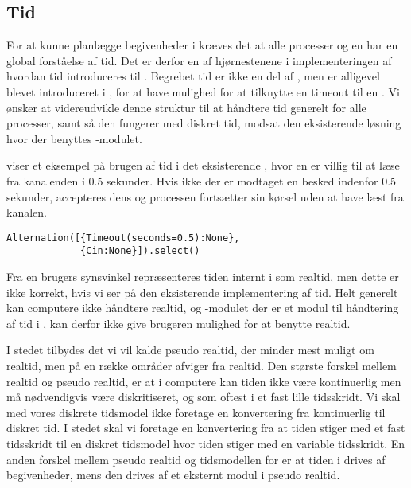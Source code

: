 \subsection{Tid} \label{sec:tid}
For at kunne planlægge begivenheder i \des kræves det at alle processer og \sched en har en global forståelse af tid.  Det er derfor en af hjørnestenene i implementeringen af \des hvordan tid introduceres til \pycsp.  
Begrebet tid er ikke en del af \csp, men er alligevel blevet introduceret i \pycsp, for  at  have
mulighed for at tilknytte en timeout til en . Vi ønsker
at videreudvikle denne struktur til at håndtere tid generelt for alle
processer, samt så den fungerer med diskret tid, modsat den eksisterende
løsning hvor der benyttes -modulet.
 
 viser et eksempel på brugen af tid i det eksisterende \pycsp, hvor en  er villig
til at læse fra kanalenden  i $0.5$ sekunder. Hvis ikke der
er modtaget en besked indenfor 0.5 sekunder, accepteres dens 
og processen fortsætter sin kørsel uden at have læst fra kanalen.

\begin{lstlisting}[float=hbtp, 
label=Timeout,caption=Timeout i Alternation (fra dokumentationen til PyCSP)]
Alternation([{Timeout(seconds=0.5):None}, 
             {Cin:None}]).select()
\end{lstlisting}


Fra en brugers synsvinkel repræsenteres tiden internt i \pycsp som realtid, men dette er ikke korrekt, hvis vi ser på den eksisterende implementering af tid. Helt generelt kan computere ikke håndtere  realtid, og -modulet der er et modul til håndtering af tid i \pycsp, kan derfor ikke give brugeren mulighed for at benytte realtid. 

 I stedet tilbydes det vi vil kalde pseudo realtid, der minder mest muligt om realtid, men på en række områder afviger fra realtid. Den største forskel mellem realtid og pseudo realtid, er at i computere kan tiden ikke være kontinuerlig men må nødvendigvis være  diskritiseret, og som oftest i et fast lille tidsskridt. Vi skal med vores diskrete tidsmodel ikke foretage en konvertering fra kontinuerlig  til diskret tid. I stedet skal vi foretage en konvertering fra at tiden stiger med et fast tidsskridt til en diskret tidsmodel hvor tiden stiger med en variable tidsskridt. En anden forskel mellem pseudo realtid og tidsmodellen for \des er at tiden i \des drives af begivenheder, mens den drives af et eksternt modul i pseudo realtid. 
 
